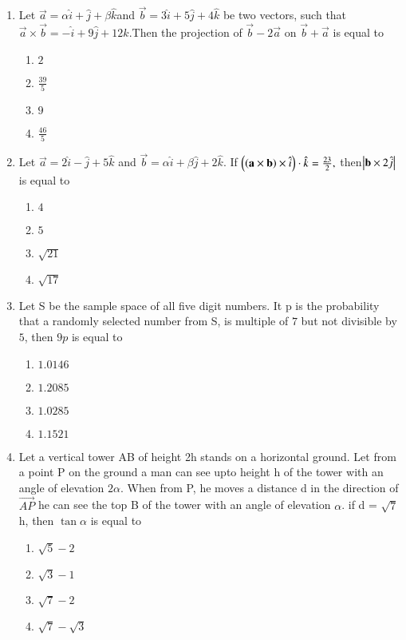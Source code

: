 \documentclass[journal,12pt,twocolumn]{IEEEtran}
\theoremstyle{remark}
\begin{document}
\begin{enumerate}[start=1]
\begin{enumerate}
\end{enumerate}
\item Let $\vec{a} = \alpha \hat{i} + \hat{j} + \beta \hat{k} $and $ \vec{b} = 3 \hat{i} + 5\hat{j} + 4 \hat{k} $ be two vectors, such that $\vec{a} \times \vec{b} = -\hat{i} + 9\hat{j} + 12 \hat{k}. $Then the projection of $ \vec{b}-2\vec{a} $ on $ \vec{b}+ \vec{a}$ is equal to
\hfill{}
	\begin{enumerate}
    \item $2$
    \item $\frac{39}{5}$
    \item $9$
    \item $\frac{46}{5}$
\end{enumerate}
\item Let $\vec{a} = 2\hat{i}-\hat{j}+5\hat{k}$ and $ \vec{b} = \alpha \hat{i} + \beta \hat{j}+2\hat{k}.$ If $\left(\left(\mathbf{a}\times \mathbf{b}\right) \times \hat{i}\right)\cdot \hat{k}=\frac{23}{2},$ then$ \left\vert\mathbf{b}\times 2\hat{j}\right\vert$ is equal to
\hfill{}
	\begin{enumerate}
    \item $4$
    \item $5$
    \item $\sqrt{21}$
    \item $\sqrt{17}$
\end{enumerate}
\item Let S be the sample space of all five digit numbers. It p is the probability that a randomly selected number from S, is multiple of $7$ but not divisible by $5$, then $9p$ is equal to
\hfill{}
	\begin{enumerate}
    \item $1.0146$
    \item $1.2085$
    \item $1.0285$
    \item $1.1521$
\end{enumerate}
\item  Let a vertical tower AB of height 2h stands on a horizontal ground. Let from a point P on the ground a man can see upto height h of the tower with an angle of elevation $2\alpha$. When from P, he moves a distance d in the direction of $ \overrightarrow{AP}$ he can see the top B of the tower with an angle of elevation $\alpha$.  if d = $\sqrt{7}$ h, then $\tan \alpha$ is equal to
\hfill{}
	\begin{enumerate}
    \item $ \sqrt{5}-2$
    \item $ \sqrt{3}-1$
    \item $ \sqrt{7}-2$
    \item $ \sqrt{7}-\sqrt{3}$
\end{enumerate}
\end{enumerate}
\end{document}
